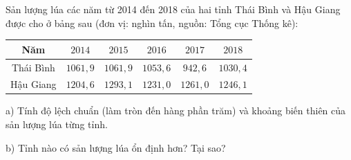 \begin{ex}
Sản lượng lúa các năm từ 2014 đến 2018 của hai tỉnh Thái Bình và Hậu Giang được cho ở bảng sau (đơn vị: nghìn tấn, nguồn: Tổng cục Thống kê):
\begin{center}
\begin{tabular}{|c|c|c|c|c|c|}\hline
Năm & $2014$ & $2015$ & $2016$ & $2017$ & $2018$\\\hline
Thái Bình & $1061{,}9$ & $1061{,}9$ & $1053{,}6$ & $942{,}6$ & $1030{,}4$\\\hline
Hậu Giang & $1204{,}6$ & $1293{,}1$ & $1231{,}0$ & $1261{,}0$ & $1246{,}1$\\\hline
\end{tabular}
\end{center}
a) Tính độ lệch chuẩn (làm tròn đến hàng phần trăm) và khoảng biến thiên của sản lượng lúa từng tỉnh.

b) Tỉnh nào có sản lượng lúa ổn định hơn? Tại sao?
\end{ex}
